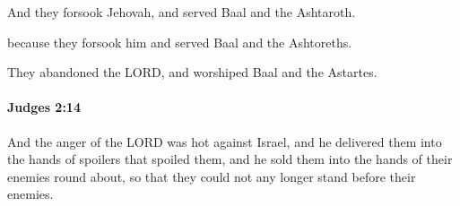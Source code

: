 			\begin{versebox}
					\item[BHS] 
					\item[ASV] And they forsook Jehovah, and served Baal and the Ashtaroth.
					\item[NIV] because they forsook him and served Baal and the Ashtoreths.
					\item[NRSV] They abandoned the LORD, and worshiped Baal and the Astartes.
			\end{versebox}

		\paragraph{Judges 2:14} %
			\label{JUDGES-2-14}

			And the anger of the LORD was hot against Israel, and he delivered them into the hands of spoilers that spoiled them, and he sold them into the hands of their enemies round about, so that they could not any longer stand before their enemies.

